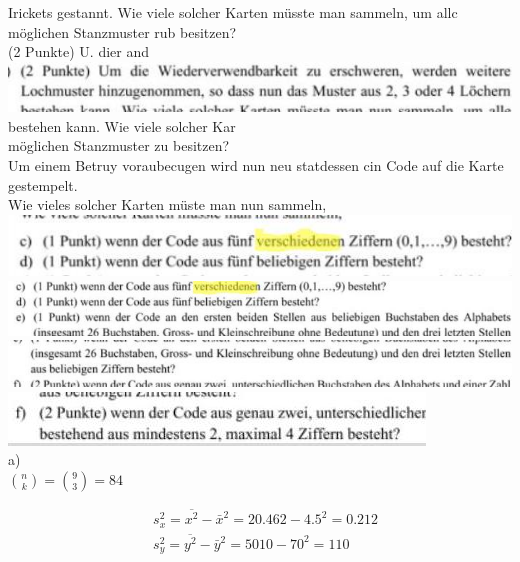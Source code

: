 \documentclass[10pt]{article}
\begin{document}
{Irickets gestannt. Wie viele solcher Karten müsste man sammeln, um allc\\
möglichen Stanzmuster rub besitzen?\\
(2 Punkte) U. dier and\\
\includegraphics[width=\linewidth]{images/2024_12_29_0906b02acf849bda8665g-4(7)} bestehen kann. Wie viele solcher Kar\\
möglichen Stanzmuster zu besitzen?\\
Um einem Betruy voraubecugen wird nun neu statdessen cin Code auf die Karte gestempelt.\\
Wie vieles solcher Karten müste man nun sammeln,\\
\includegraphics[width=\linewidth]{images/2024_12_29_0906b02acf849bda8665g-4}\\
\includegraphics[width=\linewidth]{images/2024_12_29_0906b02acf849bda8665g-4(3)}\\
\includegraphics[width=\linewidth]{images/2024_12_29_0906b02acf849bda8665g-4(5)}\\
\includegraphics[width=\linewidth]{images/2024_12_29_0906b02acf849bda8665g-4(4)}\\
a)\\
$\binom{n}{k}=\binom{9}{3}=84$

$$
\begin{aligned}
& s_{x}^{2}=\overline{x^{2}}-\bar{x}^{2}=20.462-4.5^{2}=0.212 \\
& s_{y}^{2}=\overline{y^{2}}-\bar{y}^{2}=5010-70^{2}=110
\end{aligned}
$$

}
\end{document}
